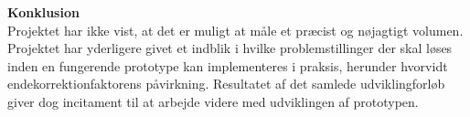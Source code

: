 \textbf{Konklusion} \\
 Projektet har ikke vist, at det er muligt at måle et præcist og nøjagtigt volumen. Projektet har yderligere givet
et indblik i hvilke problemstillinger der skal løses inden en fungerende prototype kan implementeres i praksis, herunder hvorvidt endekorrektionfaktorens påvirkning.
Resultatet af det samlede udviklingforløb giver dog incitament til at arbejde videre med udviklingen af prototypen.  